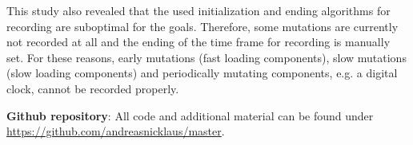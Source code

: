 \documentclass[a4paper, 12pt]{article}
\makeatletter
\renewcommand\listoffigures{%
  \section{\listfigurename}%
  \@mkboth{\MakeUppercase\listfigurename}{\MakeUppercase\listfigurename}%
  \@starttoc{lof}%
}
\renewcommand\listoftables{%
  \section{\listtablename}%
  \@mkboth{\MakeUppercase\listtablename}{\MakeUppercase\listtablename}%
  \@starttoc{lot}%
}
\renewcommand\lstlistoflistings{
  \section{\lstlistlistingname}
  \@starttoc{lol}%
}
\makeatother
\begin{document}
This study also revealed that the used initialization and ending algorithms for recording are suboptimal for the goals. 
Therefore, some mutations are currently not recorded at all and the ending of the time frame for recording is manually set.
For these reasons, early mutations (fast loading components), slow mutations (slow loading components) and periodically mutating components, e.g. a digital clock, cannot be recorded properly.

\pagebreak

\appendix



\printnoidxglossary[
  type=\acronymtype,
  nonumberlist,
  nogroupskip,
]

{}

\textbf{Github repository}: All code and additional material can be found under \url{https://github.com/andreasnicklaus/master}.

\end{document}

